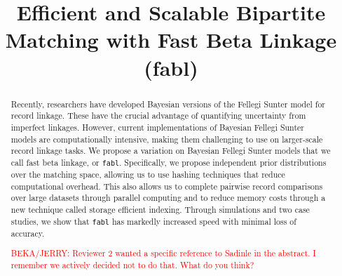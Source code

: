 \documentclass[ba]{imsart}
\begin{document}
\linenumbers
\begin{frontmatter}
\title{Efficient and Scalable Bipartite Matching with Fast Beta Linkage  (fabl)}


\begin{abstract}
Recently, researchers have developed Bayesian versions of the Fellegi Sunter model for record linkage. These have the crucial advantage of quantifying uncertainty from imperfect linkages.  However, current implementations of Bayesian Fellegi Sunter models are computationally intensive, making them challenging to use on larger-scale record linkage tasks.  We propose a variation on Bayesian Fellegi Sunter models that we call fast beta linkage, or \texttt{fabl}.  Specifically, we propose independent prior distributions over the matching space, allowing us to use hashing techniques that reduce computational overhead. This also allows us to complete pairwise record comparisons over large datasets through parallel computing and to reduce memory costs through a new technique called storage efficient indexing. Through simulations and two case studies, we show that \texttt{fabl} has markedly increased speed with minimal loss of accuracy.

\textcolor{red}{BEKA/JERRY: Reviewer 2 wanted a specific reference to Sadinle in the abstract. I remember we actively decided not to do that. What do you think?}
\end{abstract}

\begin{keyword}%
\end{keyword}

\end{frontmatter}
\end{document}
